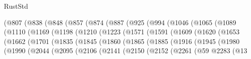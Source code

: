 \begin{lexlean}{RustStd}
\begin{coremodule}
{\begin{coremodule}
{{{{{{{{{{{{{{{{{{{{{{{{{{{{{{{{{{{{{{{{{{{{{{{{{{{{{{{                (@807
                  (@838
                    (@848
                      (@857
                        (@874
                          (@887
                            (@925
                              (@994
                                (@1046
                                  (@1065
                                    (@1089
                                      (@1110
                                        (@1169
                                          (@1198
                                            (@1210
                                              (@1223
                                                (@1571
                                                  (@1591
                                                    (@1609
                                                      (@1620
                                                        (@1653
                                                          (@1662
                                                            (@1701
                                                              (@1835
                                                                (@1845
                                                                  (@1860
                                                                    (@1865
                                                                      (@1885
                                                                        (@1916
                                                                          (@1945
                                                                            (@1980
                                                                              (@1990
                                                                                (@2044
                                                                                  (@2095
                                                                                    (@2106
                                                                                      (@2141
                                                                                        (@2150
                                                                                          (@2152
                                                                                            (@2261
                                                                                              (@59
                                                                                                @2283
                                                                                                (@13
}}}}}}}}}}}}}}}}}}}}}}}}}}}}}}}}}}}}}}}}}}}}}}}}}}}}}}}
\end{coremodule}}
\end{coremodule}
\end{lexlean}
